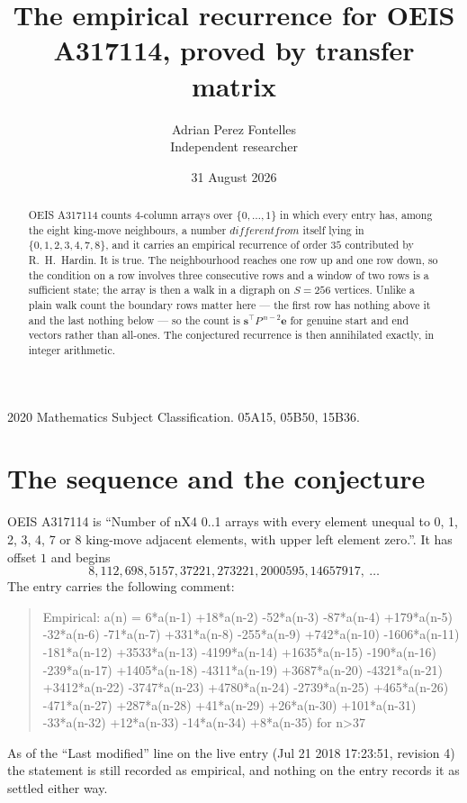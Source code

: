 \documentclass[11pt,a4paper]{article}
\title{The empirical recurrence for OEIS A317114, proved by transfer matrix}
\author{Adrian Perez Fontelles\\ \small Independent researcher}
\date{31 August 2026}
\theoremstyle{plain}
\theoremstyle{definition}
\begin{document}
\maketitle

\begin{abstract}
OEIS A317114 counts $4$-column arrays over $\{0,\dots,1\}$ in which every entry has,
among the eight king-move neighbours, a number $different from$ itself lying in $\{0,1,2,3,4,7,8\}$, and it carries an empirical
recurrence of order $35$ contributed by R.~H.~Hardin. It is true. The neighbourhood
reaches one row up and one row down, so the condition on a row involves three consecutive
rows and a window of two rows is a sufficient state; the array is then a walk in a digraph
on $S=256$ vertices. Unlike a plain walk count the boundary rows matter here --- the first
row has nothing above it and the last nothing below --- so the count is
$\mathbf{s}^{\!\top}P^{\,n-2}\mathbf{e}$ for genuine start and end vectors rather than
all-ones. The conjectured recurrence is then annihilated exactly, in integer arithmetic.
\end{abstract}

\noindent\small 2020 Mathematics Subject Classification. 05A15, 05B50, 15B36.\normalsize

\section{The sequence and the conjecture}

OEIS A317114 is ``Number of nX4 0..1 arrays with every element unequal to 0, 1, 2, 3, 4, 7 or 8 king-move adjacent elements, with upper left element zero.''. It has offset
$1$ and begins
\[
8, 112, 698, 5157, 37221, 273221, 2000595, 14657917,\ \dots
\]
The entry carries the following comment:
\begin{quote}\small
Empirical: a(n) = 6*a(n-1) +18*a(n-2) -52*a(n-3) -87*a(n-4) +179*a(n-5) -32*a(n-6) -71*a(n-7) +331*a(n-8) -255*a(n-9) +742*a(n-10) -1606*a(n-11) -181*a(n-12) +3533*a(n-13) -4199*a(n-14) +1635*a(n-15) -190*a(n-16) -239*a(n-17) +1405*a(n-18) -4311*a(n-19) +3687*a(n-20) -4321*a(n-21) +3412*a(n-22) -3747*a(n-23) +4780*a(n-24) -2739*a(n-25) +465*a(n-26) -471*a(n-27) +287*a(n-28) +41*a(n-29) +26*a(n-30) +101*a(n-31) -33*a(n-32) +12*a(n-33) -14*a(n-34) +8*a(n-35) for n>37
\end{quote}
As of the ``Last modified'' line on the live entry (Jul 21 2018 17:23:51, revision
4) the statement is still recorded as empirical, and nothing on the entry
records it as settled either way.
\end{document}
